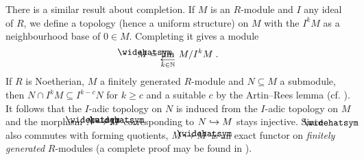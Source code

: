\documentclass[a4paper,parskip=half,numbers=enddot, DIV=12]{scrreprt}
\begin{document}
There is a similar result about completion. If $M$ is an $R$-module and $I$ any ideal of $R$, we define a topology (hence a uniform structure) on $M$ with the $I^kM$ as a neighbourhood base of $0\in M$. Completing it gives a module 
\begin{align*}
	\roof{M}=\limit[k\in\IN] M/I^kM\;. 
\end{align*}
If $R$ is Noetherian, $M$ a finitely generated $R$-module and $N\subseteq M$ a submodule, then $N\cap I^kM\subseteq I^{k-c}N$ for $k\geq c$ and a suitable $c$ by the Artin--Rees lemma (cf. \cite[Proposition~3.4.1]{alg2}). It follows that the $I$-adic topology on $N$ is induced from the $I$-adic topology on $M$ and the morphism $\roof{N}\morphism\roof{M}$ corresponding to $N\monomorphism M$ stays injective. Since $\roof{\phantom{x}}$ also commutes with forming quotients, $M\mapsto\roof{M}$ is an exact functor on \emph{finitely generated} $R$-modules (a complete proof may be found in \cite[Lemma~7.15]{eisenbudCommAlg}). 
\end{document}
